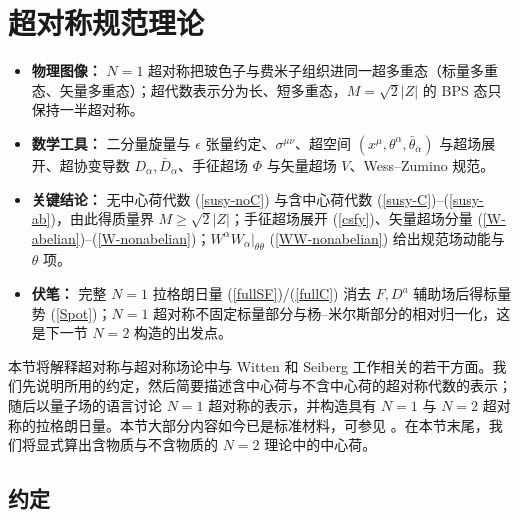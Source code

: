 \section{超对称规范理论}


\begin{keypoints}
\begin{itemize}
  \item \textbf{物理图像：} $N=1$ 超对称把玻色子与费米子组织进同一超多重态（标量多重态、矢量多重态）；超代数表示分为长、短多重态，$M=\sqrt2|Z|$ 的 BPS 态只保持一半超对称。
  \item \textbf{数学工具：} 二分量旋量与 $\epsilon$ 张量约定、$\sigma^{\mu\nu}$、超空间 $(x^\mu,\theta^\alpha,\bar\theta_{\dot\alpha})$ 与超场展开、超协变导数 $D_\alpha,\bar D_{\dot\alpha}$、手征超场 $\Phi$ 与矢量超场 $V$、Wess--Zumino 规范。
  \item \textbf{关键结论：} 无中心荷代数 (\ref{susy-noC}) 与含中心荷代数 (\ref{susy-C})--(\ref{susy-ab})，由此得质量界 $M\geq\sqrt2|Z|$；手征超场展开 (\ref{csfy})、矢量超场分量 (\ref{W-abelian})--(\ref{W-nonabelian})；$W^\alpha W_\alpha|_{\theta\theta}$ (\ref{WW-nonabelian}) 给出规范场动能与 $\theta$ 项。
  \item \textbf{伏笔：} 完整 $N=1$ 拉格朗日量 (\ref{fullSF})/(\ref{fullC}) 消去 $F,D^a$ 辅助场后得标量势 (\ref{Spot})；$N=1$ 超对称不固定标量部分与杨--米尔斯部分的相对归一化，这是下一节 $N=2$ 构造的出发点。
\end{itemize}
\end{keypoints}

本节将解释超对称与超对称场论中与 Witten 和 Seiberg 工作相关的若干方面。我们先说明所用的约定，然后简要描述含中心荷与不含中心荷的超对称代数的表示；随后以量子场的语言讨论 $N=1$ 超对称的表示，并构造具有 $N=1$ 与 $N=2$ 超对称的拉格朗日量。本节大部分内容如今已是标准材料，可参见 \cite{WB,West,Sohnius}。在本节末尾，我们将显式算出含物质与不含物质的 $N=2$ 理论中的中心荷。

\subsection{约定}


